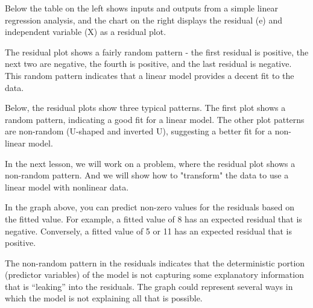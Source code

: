\documentclass[12pt, a4paper]{article}
\theoremstyle{plain}
\theoremstyle{definition}
\theoremstyle{remark}
\begin{document}

Below the table on the left shows inputs and outputs from a simple linear regression analysis, and the chart on the right displays the residual (e) and independent variable (X) as a residual plot.

\newpage
The residual plot shows a fairly random pattern - the first residual is positive, the next two are negative, the fourth is positive, and the last residual is negative. This random pattern indicates that a linear model provides a decent fit to the data.

Below, the residual plots show three typical patterns. The first plot shows a random pattern, indicating a good fit for a linear model. The other plot patterns are non-random (U-shaped and inverted U), suggesting a better fit for a non-linear model.

		
In the next lesson, we will work on a problem, where the residual plot shows a non-random pattern. And we will show how to "transform" the data to use a linear model with nonlinear data.

\newpage
In the graph above, you can predict non-zero values for the residuals based on the fitted value. For example, a fitted value of 8 has an expected residual that is negative. Conversely, a fitted value of 5 or 11 has an expected residual that is positive.

The non-random pattern in the residuals indicates that the deterministic portion (predictor variables) of the model is not capturing some explanatory information that is “leaking” into the residuals. The graph could represent several ways in which the model is not explaining all that is possible. 
\end{document}
